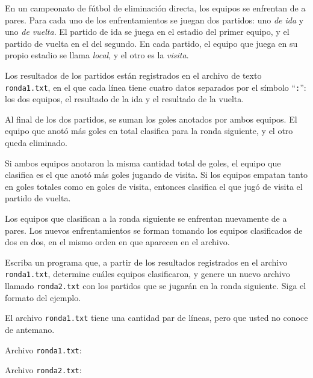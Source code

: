 En un campeonato de fútbol de eliminación directa, los equipos se enfrentan de a pares.
Para cada uno de los enfrentamientos se juegan dos partidos:
uno \emph{de ida} y uno \emph{de vuelta}.
El partido de ida se juega en el estadio del primer equipo,
y el partido de vuelta en el del segundo.
En cada partido, el equipo que juega en su propio estadio se llama \emph{local},
y el otro es la \emph{visita}.

Los resultados de los partidos están registrados en el archivo de texto \texttt{ronda1.txt},
en el que cada línea tiene cuatro datos separados por el símbolo ``\verb+:+'':
los dos equipos, el resultado de la ida y el resultado de la vuelta.

Al final de los dos partidos,
se suman los goles anotados por ambos equipos.
El equipo que anotó más goles en total clasifica para la ronda siguiente,
y el otro queda eliminado.

Si ambos equipos anotaron la misma cantidad total de goles,
el equipo que clasifica es el que anotó más goles jugando de visita.
Si los equipos empatan tanto en goles totales como en goles de visita,
entonces clasifica el que jugó de visita el partido de vuelta.

Los equipos que clasifican a la ronda siguiente se enfrentan nuevamente de a pares.
Los nuevos enfrentamientos se forman tomando los equipos clasificados de dos en dos,
en el mismo orden en que aparecen en el archivo.

Escriba un programa que,
a partir de los resultados registrados en el archivo \texttt{ronda1.txt},
determine cuáles equipos clasificaron,
y genere un nuevo archivo llamado \texttt{ronda2.txt}
con los partidos que se jugarán en la ronda siguiente.
Siga el formato del ejemplo.

El archivo \texttt{ronda1.txt} tiene una cantidad par de líneas,
pero que usted no conoce de antemano.

\begin{minipage}[t]{.28\textwidth}
  Archivo \texttt{ronda1.txt}:
  
\end{minipage}
\hspace{3em}
\begin{minipage}[t]{.28\textwidth}
  Archivo \texttt{ronda2.txt}:
  
\end{minipage}

